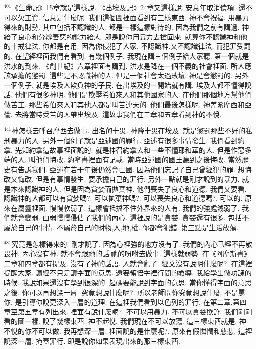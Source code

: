 \documentclass{book}
\begin{document}
$^{401}$《生命記》15章就是這樣說.
《出埃及記》24章又這樣說.
安息年取消債項.
還不可以欠工資.
信息是什麼呢.
我們這個圖裡面看到有三樣東西.
神不會祝福.
用暴力得來的財勢.
其中包括不認識的人.
都是一樣這樣對待的.
因為我們之前有講過.
神給了良心和分辨善惡的能力給人.
即是說你用暴力去搶回來.
就算你不認識神和他的十戒律法.
你都是有用.
因為你侵犯了人家.
不認識神,又不認識律法.
而犯罪受罰的.
在聖經裡面我們有看到.
有幾個例子.
我現在講三個例子給大家聽.
第一個就是洪水的到來.
《創世紀》六章裡面有講到.
洪水是降在一個不義的社會裡面.
所人應該承擔的懲罰.
這些是不認識神的人.
但是一個社會太過敗壞.
神是會懲罰的.
另外一個例子.
就是埃及人欺負神的子民.
在出埃及的一開始就有講.
埃及人都不懂得說話.
他們有很多神明.
他們是欺壓希伯來人和其他國家的人.
在他們那個地方幫他們做苦工.
那些希伯來人和其他人都是叫苦連天的.
他們最後怎樣呢.
神差派摩西和亞倫.
去將當時受苦的人帶出埃及.
這故事我們在三章和五章看到神的不悅.

$^{441}$神怎樣去呼召摩西去做事.
出名的十災.
神降十災在埃及.
就是懲罰那些不好的私刑暴力的人.
另外一個例子就是亞述國的罪行.
亞述有很多事情發生.
我們看到約拿.
先知約拿這故事裡面說的.
就是神召約拿去和一些不懂耶和華的人.
但是作惡多端的人.
叫他們悔改.
約拿書裡面有記載.
當時亞述國的國王聽到之後悔改.
當然歷史有告訴我們.
亞述在若干年後仍然會亡國.
因為他們忘記了自己曾經犯的罪.
想悔改又悔改.
但是有事情發生.
要承擔自己的罪行.
另外一點就是剛才說到的暴力.
就是本來認識神的人.
但是因為貪婪而拋棄神.
他們喪失了良心和道德.
我們又要看.
認識神的人都可以有貪婪嗎?.
可以拋棄神嗎?.
可以喪失良心和道德嗎?.
可以的.
原來在屬靈裡面.
慢慢軟弱了.
這樣會抵擋不住外界來的人有.
我們的強處減弱了.
我們就會變弱.
由弱慢慢侵佔了我們的內心.
這裡說的是貪婪.
貪婪還有很多.
包括不屬於自己的事情.
不屬於自己的財物,人,地,權.
你都會犯錯.
第三點是生活放蕩.

$^{481}$究竟是怎樣得來的.
剛才說了.
因為心裡強的地方沒有了.
我們的內心已經不再敬畏神.
內心沒有神.
就不會跟祂的話,祂的吩咐去做事.
這樣就弱勢.
在《阿摩斯書》二章和四章都有提及.
沒有了神的話語.
人就會亂了.
經文沒有說明什麼呢?.
在這裡提醒大家.
讀經不只是讀字面的意思.
還要領悟字裡行間的教導.
我給學生做功課的時候.
我說如果還沒有學到很深的.
起碼要能說到字面的意思.
當你懂得字面的意思之後.
你可以再想深一層.
究竟想說什麼呢?.
所以老師問你究竟想說什麼.
不是罵你.
是引導你說更深入一層的道理.
在這裡我們看到以色列的罪行.
在第二章,第四章至第五章有列出來.
裡面有說什麼呢?.
不可以用暴力.
不可以貪婪欺詐.
我們剛剛看的圖一樣.
說了幾樣東西.
神不起悅.
我們現在不可以放蕩.
這三樣東西就是.
神不悅的你不可以做.
我再想深一層.
裡面說的是什麼呢?.
原來有假憐憫和慈悲.
這裡說深一層.
掩蓋罪行.
即是說你如果表現出來的那三樣東西.
\end{document}
